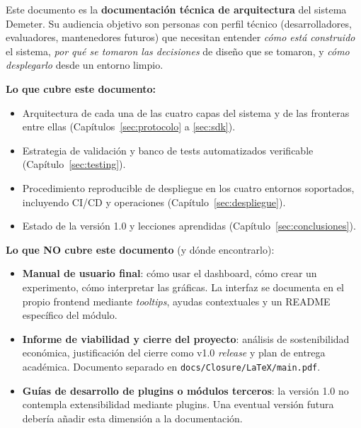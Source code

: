 Este documento es la \textbf{documentación técnica de arquitectura} del
sistema Demeter. Su audiencia objetivo son personas con perfil técnico
(desarrolladores, evaluadores, mantenedores futuros) que necesitan entender
\textit{cómo está construido} el sistema, \textit{por qué se tomaron las
decisiones} de diseño que se tomaron, y \textit{cómo desplegarlo} desde un
entorno limpio.

\textbf{Lo que cubre este documento:}

\begin{itemize}[leftmargin=*, label=--]
    \item Arquitectura de cada una de las cuatro capas del sistema y de las
          fronteras entre ellas (Capítulos~\ref{sec:protocolo} a \ref{sec:sdk}).
    \item Estrategia de validación y banco de tests automatizados verificable
          (Capítulo~\ref{sec:testing}).
    \item Procedimiento reproducible de despliegue en los cuatro entornos
          soportados, incluyendo CI/CD y operaciones
          (Capítulo~\ref{sec:despliegue}).
    \item Estado de la versión 1.0 y lecciones aprendidas
          (Capítulo~\ref{sec:conclusiones}).
\end{itemize}

\textbf{Lo que NO cubre este documento} (y dónde encontrarlo):

\begin{itemize}[leftmargin=*, label=--]
    \item \textbf{Manual de usuario final}: cómo usar el dashboard, cómo crear
          un experimento, cómo interpretar las gráficas. La interfaz se
          documenta en el propio frontend mediante \textit{tooltips}, ayudas
          contextuales y un README específico del módulo.
    \item \textbf{Informe de viabilidad y cierre del proyecto}: análisis de
          sostenibilidad económica, justificación del cierre como v1.0
          \textit{release} y plan de entrega académica. Documento separado en
          \texttt{docs/Closure/LaTeX/main.pdf}.
    \item \textbf{Guías de desarrollo de plugins o módulos terceros}: la
          versión 1.0 no contempla extensibilidad mediante plugins. Una
          eventual versión futura debería añadir esta dimensión a la
          documentación.
\end{itemize}

